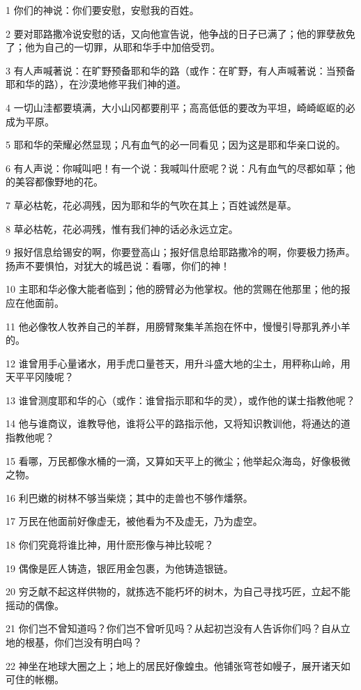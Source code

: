 \par 1 你们的神说：你们要安慰，安慰我的百姓。
\par 2 要对耶路撒冷说安慰的话，又向他宣告说，他争战的日子已满了；他的罪孽赦免了；他为自己的一切罪，从耶和华手中加倍受罚。
\par 3 有人声喊著说：在旷野预备耶和华的路（或作：在旷野，有人声喊著说：当预备耶和华的路），在沙漠地修平我们神的道。
\par 4 一切山洼都要填满，大小山冈都要削平；高高低低的要改为平坦，崎崎岖岖的必成为平原。
\par 5 耶和华的荣耀必然显现；凡有血气的必一同看见；因为这是耶和华亲口说的。
\par 6 有人声说：你喊叫吧！有一个说：我喊叫什麽呢？说：凡有血气的尽都如草；他的美容都像野地的花。
\par 7 草必枯乾，花必凋残，因为耶和华的气吹在其上；百姓诚然是草。
\par 8 草必枯乾，花必凋残，惟有我们神的话必永远立定。
\par 9 报好信息给锡安的啊，你要登高山；报好信息给耶路撒冷的啊，你要极力扬声。扬声不要惧怕，对犹大的城邑说：看哪，你们的神！
\par 10 主耶和华必像大能者临到；他的膀臂必为他掌权。他的赏赐在他那里；他的报应在他面前。
\par 11 他必像牧人牧养自己的羊群，用膀臂聚集羊羔抱在怀中，慢慢引导那乳养小羊的。
\par 12 谁曾用手心量诸水，用手虎口量苍天，用升斗盛大地的尘土，用秤称山岭，用天平平冈陵呢？
\par 13 谁曾测度耶和华的心（或作：谁曾指示耶和华的灵），或作他的谋士指教他呢？
\par 14 他与谁商议，谁教导他，谁将公平的路指示他，又将知识教训他，将通达的道指教他呢？
\par 15 看哪，万民都像水桶的一滴，又算如天平上的微尘；他举起众海岛，好像极微之物。
\par 16 利巴嫩的树林不够当柴烧；其中的走兽也不够作燔祭。
\par 17 万民在他面前好像虚无，被他看为不及虚无，乃为虚空。
\par 18 你们究竟将谁比神，用什麽形像与神比较呢？
\par 19 偶像是匠人铸造，银匠用金包裹，为他铸造银链。
\par 20 穷乏献不起这样供物的，就拣选不能朽坏的树木，为自己寻找巧匠，立起不能摇动的偶像。
\par 21 你们岂不曾知道吗？你们岂不曾听见吗？从起初岂没有人告诉你们吗？自从立地的根基，你们岂没有明白吗？
\par 22 神坐在地球大圈之上；地上的居民好像蝗虫。他铺张穹苍如幔子，展开诸天如可住的帐棚。
